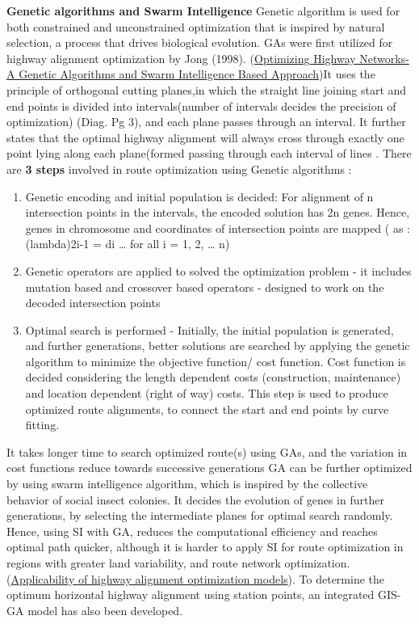 \textbf{Genetic algorithms and Swarm Intelligence}
Genetic algorithm is used for both constrained and unconstrained optimization that is inspired by natural selection, a process that drives biological evolution. GAs were first utilized for highway alignment optimization by Jong (1998). (\href{https://ascelibrary.org/doi/10.1061/40652%282003%297}{Optimizing Highway Networks- A Genetic Algorithms and Swarm Intelligence Based Approach})It uses the principle of orthogonal cutting planes,in which the straight line joining start and end points is divided into intervals(number of intervals decides the precision of optimization) (Diag. Pg 3), and each plane passes through an interval. It further states that the optimal highway alignment will always cross through exactly one point lying along each plane(formed passing through each interval of lines . 
There are \textbf{3 steps} involved in route optimization using Genetic algorithms : 
\begin{enumerate}
\item Genetic encoding and initial population is decided: For alignment of n intersection points in the intervals, the encoded solution has 2n genes. Hence, genes in chromosome and coordinates of intersection points are mapped ( as : (lambda)2i-1 = di … for all i = 1, 2, … n)
\item Genetic operators are applied to solved the optimization problem - it includes mutation based and crossover based operators - designed to work on the decoded intersection points
\item Optimal search is performed - Initially, the initial population is generated, and further generations, better solutions are searched by applying the genetic algorithm to minimize the objective function/ cost function. Cost function is decided considering the length dependent costs (construction, maintenance) and location dependent (right of way) costs. This step is used to produce optimized route alignments, to connect the start and end points by curve fitting.
\end{enumerate}
It takes longer time to search optimized route(s) using GAs, and the variation in cost functions reduce towards successive generations
GA can be further optimized by using swarm intelligence algorithm, which is inspired by the collective behavior of social insect colonies. It decides the evolution of genes in further generations, by selecting the intermediate planes for optimal search randomly. Hence, using SI with GA, reduces the computational efficiency and reaches optimal path quicker, although it is harder to apply SI for route optimization in regions with greater land variability, and route network optimization. (\href{https://www.sciencedirect.com/science/article/pii/S0968090X11001422}{Applicability of highway alignment optimization models}). To determine the optimum horizontal highway alignment using station points, an integrated GIS-GA model has also been developed.
